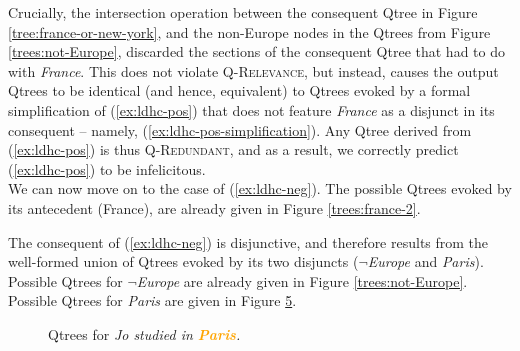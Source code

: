 Crucially, the intersection operation between the consequent Qtree in Figure \ref{tree:france-or-new-york}, and the non-Europe nodes in the Qtrees from Figure \ref{trees:not-Europe}, discarded the sections of the consequent Qtree that had to do with \textit{France}. This does not violate \textsc{Q-Relevance}, but instead, causes the output Qtrees to be identical (and hence, equivalent) to Qtrees evoked by a formal simplification of (\ref{ex:ldhc-pos}) that does not feature \textit{France} as a disjunct in its consequent -- namely, (\ref{ex:ldhc-pos-simplification}). Any Qtree derived from (\ref{ex:ldhc-pos}) is thus \textsc{Q-Redundant}, and as a result, we correctly predict (\ref{ex:ldhc-pos}) to be infelicitous.\\

We can now move on to the case of (\ref{ex:ldhc-neg}). The possible Qtrees evoked by its antecedent (France), are already given in Figure \ref{trees:france-2}.


The consequent of (\ref{ex:ldhc-neg}) is disjunctive, and therefore results from the well-formed union of Qtrees evoked by its two disjuncts ($\neg$\textit{Europe} and \textit{Paris}). Possible Qtrees for $\neg$\textit{Europe} are already given in Figure \ref{trees:not-Europe}. Possible Qtrees for \textit{Paris} are given in Figure \ref{trees:paris}.

\begin{figure}[H]
	\centering
	\begin{subfigure}[b]{.3\linewidth}
		\centering
		\caption{}\label{tree:paris-polar}
	\end{subfigure}
	\hfill
	\begin{subfigure}[b]{.3\linewidth}
		\centering
		\caption{}\label{tree:paris-wh}
	\end{subfigure}\hfill
	\begin{subfigure}[b]{.3\linewidth}
		\centering
		\caption{}\label{tree:paris-tiered}
	\end{subfigure}
	\begin{subfigure}[b]{.3\linewidth}
		\centering
		\caption{}\label{tree:paris-tiered-tiered}
	\end{subfigure}
	
	
	\caption{Qtrees for \textit{Jo studied in \textbf{\textcolor{orange}{Paris}}.}}\label{trees:paris}
\end{figure}

